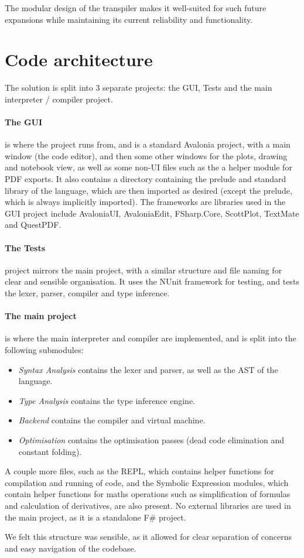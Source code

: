 The modular design of the transpiler makes it well-suited for such future expansions while maintaining its current reliability and functionality.

\section{Code architecture}\label{sec:code-architecture}
The solution is split into 3 separate projects: the GUI, Tests and the main interpreter / compiler project.
\paragraph{The GUI} is where the project runs from, and is a standard Avalonia project, with a main window (the code editor), 
and then some other windows for the plots, drawing and notebook view, as well as some non-UI files such as the a helper 
module for PDF exports.
It also contains a directory containing the prelude and standard library of the language, which are then imported as 
desired (except the prelude, which is always implicitly imported).
The frameworks are libraries used in the GUI project include AvaloniaUI, AvaloniaEdit, FSharp.Core, ScottPlot, 
TextMate and QuestPDF\@. 
\paragraph{The Tests} project mirrors the main project, with a similar structure and file naming for clear and sensible
organisation.
It uses the NUnit framework for testing, and tests the lexer, parser, compiler and type inference.
\paragraph{The main project} is where the main interpreter and compiler are implemented, and is split into the following
submodules:
\begin{itemize}
    \item \textit{Syntax Analysis} contains the lexer and parser, as well as the AST of the language.
    \item \textit{Type Analysis} contains the type inference engine.
    \item \textit{Backend} contains the compiler and virtual machine.
    \item \textit{Optimisation} contains the optimisation passes (dead code elimination and constant folding).
\end{itemize}
A couple more files, such as the REPL, which contains helper functions for compilation and running of code, and the
Symbolic Expression modules, which contain helper functions for maths operations such as simplification of formulas 
and calculation of derivatives, are also present.
No external libraries are used in the main project, as it is a standalone F\# project.

We felt this structure was sensible, as it allowed for clear separation of concerns and easy navigation of the codebase.


